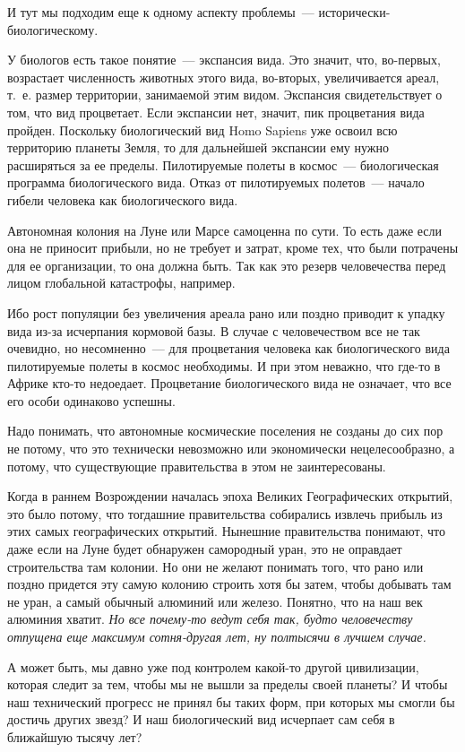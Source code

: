 \documentclass{scrbook}
\newcommand{\mdash}{~--- }
\begin{document}
И тут мы подходим еще к одному аспекту проблемы{\mdash}исторически-биологическому.

У биологов есть такое понятие{\mdash}экспансия вида. Это значит, что, во-первых, возрастает численность животных этого вида, во-вторых, увеличивается ареал, т.~е. размер территории, занимаемой этим видом. Экспансия свидетельствует о том, что вид процветает. Если экспансии нет, значит, пик процветания вида пройден. Поскольку биологический вид Homo Sapiens уже освоил всю территорию планеты Земля, то для дальнейшей экспансии ему нужно расширяться за ее пределы. Пилотируемые полеты в космос{\mdash}биологическая программа биологического вида. Отказ от пилотируемых полетов{\mdash}начало гибели человека как биологического вида.

Автономная колония на Луне или Марсе самоценна по сути. То есть даже если она не приносит прибыли, но не требует и затрат, кроме тех, что были потрачены для ее организации, то она должна быть. Так как это резерв человечества перед лицом глобальной катастрофы, например.

Ибо рост популяции без увеличения ареала рано или поздно приводит к упадку вида из-за исчерпания кормовой базы. В случае с человечеством все не так очевидно, но несомненно{\mdash}для процветания человека как биологического вида пилотируемые полеты в космос необходимы. И при этом неважно, что где-то в Африке кто-то недоедает. Процветание биологического вида не означает, что все его особи одинаково успешны.

Надо понимать, что автономные космические поселения не созданы до сих пор не потому, что это технически невозможно или экономически нецелесообразно, а потому, что существующие правительства в этом не заинтересованы.

Когда в раннем Возрождении началась эпоха Великих Географических открытий, это было потому, что тогдашние правительства собирались извлечь прибыль из этих самых географических открытий. Нынешние правительства понимают, что даже если на Луне будет обнаружен самородный уран, это не оправдает строительства там колонии. Но они не желают понимать того, что рано или поздно придется эту самую колонию строить хотя бы затем, чтобы добывать там не уран, а самый обычный алюминий или железо. Понятно, что на наш век алюминия хватит. \emph{Но все почему-то ведут себя так, будто человечеству отпущена еще максимум сотня-другая лет, ну полтысячи в лучшем случае.}

А может быть, мы давно уже под контролем какой-то другой цивилизации, которая следит за тем, чтобы мы не вышли за пределы своей планеты? И чтобы наш технический прогресс не принял бы таких форм, при которых мы смогли бы достичь других звезд? И наш биологический вид исчерпает сам себя в ближайшую тысячу лет?
\end{document}
